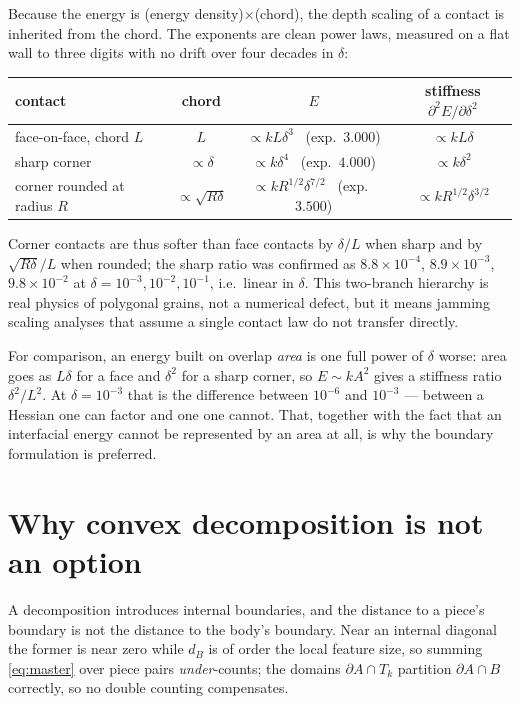 \documentclass[11pt]{article}
\begin{document}
Because the energy is (energy density)$\times$(chord), the depth scaling of a contact is inherited from the chord. The exponents are clean power laws, measured on a flat wall to three digits with no drift over four decades in $\delta$:
\begin{center}
\begin{tabular}{lccc}
\hline
contact & chord & $E$ & stiffness $\partial^2E/\partial\delta^2$\\
\hline
face-on-face, chord $L$ & $L$ & $\propto kL\delta^3$ \ (exp.\ $3.000$) & $\propto kL\delta$\\
sharp corner & $\propto\delta$ & $\propto k\delta^4$ \ (exp.\ $4.000$) & $\propto k\delta^2$\\
corner rounded at radius $R$ & $\propto\sqrt{R\delta}$ & $\propto kR^{1/2}\delta^{7/2}$ \ (exp.\ $3.500$) & $\propto kR^{1/2}\delta^{3/2}$\\
\hline
\end{tabular}
\end{center}
Corner contacts are thus softer than face contacts by $\delta/L$ when sharp and by $\sqrt{R\delta}/L$ when rounded; the sharp ratio was confirmed as $8.8\times10^{-4}$, $8.9\times10^{-3}$, $9.8\times10^{-2}$ at $\delta = 10^{-3},10^{-2},10^{-1}$, i.e.\ linear in $\delta$. This two-branch hierarchy is real physics of polygonal grains, not a numerical defect, but it means jamming scaling analyses that assume a single contact law do not transfer directly.

For comparison, an energy built on overlap \emph{area} is one full power of $\delta$ worse: area goes as $L\delta$ for a face and $\delta^2$ for a sharp corner, so $E\sim kA^2$ gives a stiffness ratio $\delta^2/L^2$. At $\delta = 10^{-3}$ that is the difference between $10^{-6}$ and $10^{-3}$ --- between a Hessian one can factor and one one cannot. That, together with the fact that an interfacial energy cannot be represented by an area at all, is why the boundary formulation is preferred.

\section{Why convex decomposition is not an option}
\label{sec:nodecomp}

A decomposition introduces internal boundaries, and the distance to a piece's boundary is not the distance to the body's boundary. Near an internal diagonal the former is near zero while $d_B$ is of order the local feature size, so summing \eqref{eq:master} over piece pairs \emph{under}-counts; the domains $\partial A\cap T_k$ partition $\partial A\cap B$ correctly, so no double counting compensates.
\end{document}
